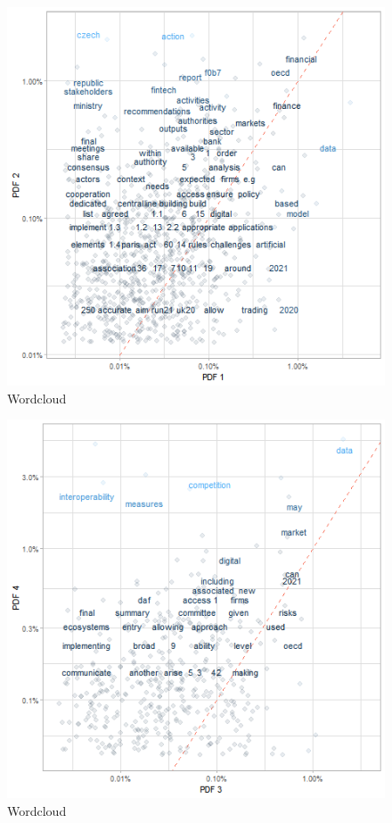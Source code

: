 \documentclass[
]{book}
\begin{document}
\begin{figure}

{\centering \includegraphics[width=0.8\linewidth]{img/p3p2} 

}

\caption{Wordcloud}\label{fig:nice-figjapN2-7}
\end{figure}
\begin{figure}

{\centering \includegraphics[width=0.8\linewidth]{img/p3p4} 

}

\caption{Wordcloud}\label{fig:nice-figjapN2-8}
\end{figure}
\end{document}
